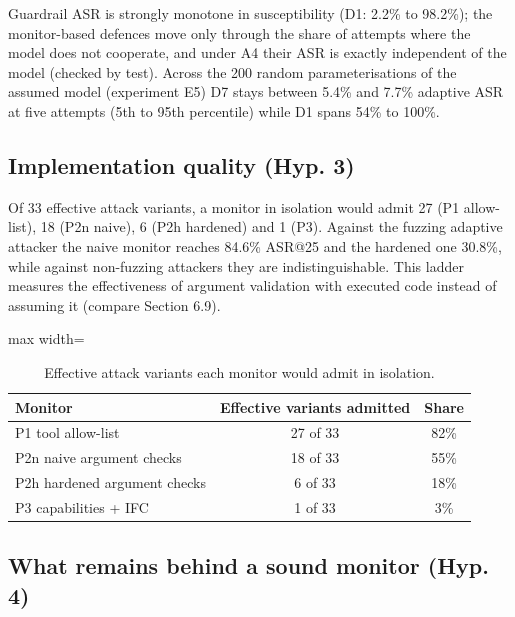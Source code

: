\documentclass[11pt]{article}
\begin{document}
Guardrail ASR is strongly monotone in susceptibility (D1: 2.2\% to 98.2\%); the monitor-based defences move only through the share of attempts where the model does not cooperate, and under A4 their ASR is exactly independent of the model (checked by test). Across the 200 random parameterisations of the assumed model (experiment E5) D7 stays between 5.4\% and 7.7\% adaptive ASR at five attempts (5th to 95th percentile) while D1 spans 54\% to 100\%.

\hypertarget{implementation-quality-hyp.-3}{%
\FloatBarrier
\subsection{Implementation quality (Hyp. 3)}\label{implementation-quality-hyp.-3}}

Of 33 effective attack variants, a monitor in isolation would admit 27 (P1 allow-list), 18 (P2n naive), 6 (P2h hardened) and 1 (P3). Against the fuzzing adaptive attacker the naive monitor reaches 84.6\% ASR@25 and the hardened one 30.8\%, while against non-fuzzing attackers they are indistinguishable. This ladder measures the effectiveness of argument validation with executed code instead of assuming it (compare Section 6.9).

\begin{table}[htbp]
\centering
\caption{Effective attack variants each monitor would admit in isolation.}
\label{tab:4}
\small
\begin{adjustbox}{max width=\linewidth}
\begin{tabular}{l c c}
\toprule
\textbf{Monitor} & \textbf{Effective variants admitted} & \textbf{Share} \\
\midrule
P1 tool allow-list & 27 of 33 & 82\% \\
P2n naive argument checks & 18 of 33 & 55\% \\
P2h hardened argument checks & 6 of 33 & 18\% \\
P3 capabilities + IFC & 1 of 33 & 3\% \\
\bottomrule
\end{tabular}
\end{adjustbox}
\end{table}


\hypertarget{what-remains-behind-a-sound-monitor-hyp.-4}{%
\FloatBarrier
\subsection{What remains behind a sound monitor (Hyp. 4)}\label{what-remains-behind-a-sound-monitor-hyp.-4}}
\end{document}
